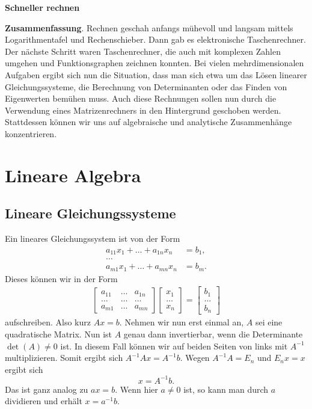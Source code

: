 \documentclass[a4paper,11pt,fleqn,twocolumn,twoside,dvipdfmx]{scrartcl}
\begin{document}
\noindent
{\huge\textbf{Schneller rechnen}}

\tableofcontents
\vspace{4mm}

\noindent
\textbf{Zusammenfassung}. Rechnen geschah anfangs mühevoll und
langsam mittels Logarithmentafel und Rechenschieber. Dann gab
es elektronische Taschenrechner. Der nächste Schritt waren
Taschenrechner, die auch mit komplexen Zahlen umgehen und
Funktionsgraphen zeichnen konnten.
Bei vielen mehrdimensionalen Aufgaben ergibt sich nun die Situation,
dass man sich etwa um das Lösen linearer Gleichungssysteme, die
Berechnung von Determinanten oder das Finden von Eigenwerten
bemühen muss. Auch diese Rechnungen sollen nun durch die
Verwendung eines Matrizenrechners in den Hintergrund geschoben
werden. Stattdessen können wir uns auf algebraische und analytische
Zusammenhänge konzentrieren.

\section{Lineare Algebra}
\subsection{Lineare Gleichungssysteme}
Ein lineares Gleichungssystem ist von der Form
\begin{align*}
a_{11}x_1+\ldots+a_{1n}x_n &= b_1,\\
\ldots\\
a_{m1}x_1+\ldots+a_{mn}x_n &= b_m.
\end{align*}
Dieses können wir in der Form
\begin{gather*}
\begin{bmatrix}
a_{11} &\ldots & a_{1n}\\
\ldots &\ldots & \ldots\\
a_{m1} &\ldots & a_{mn}
\end{bmatrix}
\begin{bmatrix}
x_1\\ \ldots\\ x_n
\end{bmatrix}
= \begin{bmatrix}
b_1\\ \ldots\\ b_n
\end{bmatrix}
\end{gather*}
aufschreiben. Also kurz $Ax=b$. Nehmen wir nun erst einmal
an, $A$ sei eine quadratische Matrix. Nun ist $A$ genau
dann invertierbar, wenn die Determinante $\det(A)\ne 0$ ist. In diesem Fall
können wir auf beiden Seiten von links mit $A^{-1}$ multiplizieren.
Somit ergibt sich $A^{-1}Ax=A^{-1}b$. Wegen $A^{-1}A=E_n$ und
$E_n x=x$ ergibt sich
\[x=A^{-1}b.\]
Das ist ganz analog zu $ax=b$. Wenn hier $a\ne 0$ ist, so kann
man durch $a$ dividieren und erhält $x=a^{-1}b$.
\end{document}
